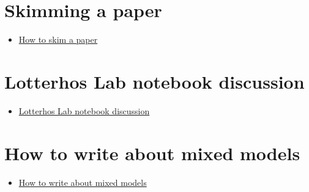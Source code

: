 \documentclass[
  letterpaper,
  DIV=11,
  numbers=noendperiod]{scrreprt}
\providecommand{\tightlist}{%
  \setlength{\itemsep}{0pt}\setlength{\parskip}{0pt}}\usepackage{longtable,booktabs,array}
\begin{document}
\hypertarget{skimming-a-paper}{%
\section*{\texorpdfstring{\textbf{Skimming a
paper}}{Skimming a paper}}\label{skimming-a-paper}}


\begin{itemize}
\tightlist
\item
  \href{https://docs.google.com/document/d/17wIUVwRGpfRMG-riBjCj9EyCnPMb-K8RX7ww5C0kzf8/edit}{How
  to skim a paper}
\end{itemize}

\hypertarget{lotterhos-lab-notebook-discussion}{%
\section*{\texorpdfstring{\textbf{Lotterhos Lab notebook
discussion}}{Lotterhos Lab notebook discussion}}\label{lotterhos-lab-notebook-discussion}}


\begin{itemize}
\tightlist
\item
  \href{https://drive.google.com/file/d/1HIVVvMbaF8XW0Jxyh708EYBTegkneJ_C/view?usp=sharing}{Lotterhos
  Lab notebook discussion}
\end{itemize}

\hypertarget{how-to-write-about-mixed-models}{%
\section*{\texorpdfstring{\textbf{How to write about mixed
models}}{How to write about mixed models}}\label{how-to-write-about-mixed-models}}


\begin{itemize}
\tightlist
\item
  \href{https://docs.google.com/document/d/1jQZkbZbZuWnElYmLUntg5qgh1NG2-yAbsT3zzvmbkZ0/edit\#heading=h.btb80w3ha1pf}{How
  to write about mixed models}
\end{itemize}
\end{document}
